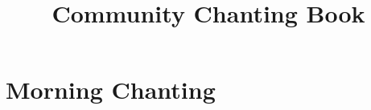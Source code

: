 \documentclass[final]{chantingbook}
\title{Community Chanting Book}
\begin{document}
\frontmatter



\mainmatter


\part{Morning Chanting}



%
%

%
%

%
%
\end{document}
